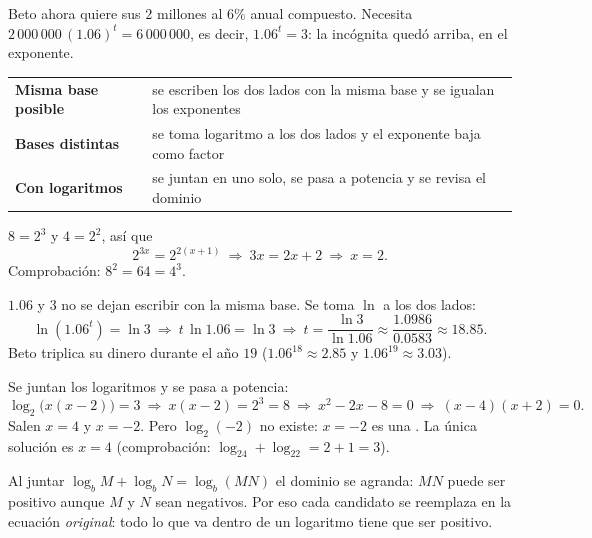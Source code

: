 \documentclass[11pt,a4paper]{article}
\begin{document}

Beto ahora quiere  sus $2$ millones al $6\%$ anual compuesto. Necesita
$2\,000\,000\,(1.06)^{t}=6\,000\,000$, es decir, $1.06^{t}=3$: la incógnita quedó arriba, en el exponente.

\begin{clavebox}[ESTRATEGIA]
\renewcommand{\arraystretch}{1.4}\begin{tabularx}{\linewidth}{@{}l L@{}}
\textbf{Misma base posible} & se escriben los dos lados con la misma base y se igualan los exponentes\\
\textbf{Bases distintas} & se toma logaritmo a los dos lados y el exponente baja como factor\\
\textbf{Con logaritmos} & se juntan en uno solo, se pasa a potencia y se revisa el dominio
\end{tabularx}
\end{clavebox}

\begin{ejemplo}[Misma base: $8^{x}=4^{x+1}$]
$8=2^{3}$ y $4=2^{2}$, así que
\[ 2^{3x}=2^{2(x+1)}\ \Longrightarrow\ 3x=2x+2\ \Longrightarrow\ x=2 . \]
Comprobación: $8^{2}=64=4^{3}$.
\end{ejemplo}

\begin{ejemplo}
$1.06$ y $3$ no se dejan escribir con la misma base. Se toma $\ln$ a los dos lados:
\[ \ln\left(1.06^{t}\right)=\ln 3\ \Longrightarrow\ t\,\ln1.06=\ln3\ \Longrightarrow\ t=\frac{\ln3}{\ln1.06}\approx\frac{1.0986}{0.0583}\approx18.85 . \]
Beto triplica su dinero durante el año $19$ ($1.06^{18}\approx2.85$ y $1.06^{19}\approx3.03$).
\end{ejemplo}

\begin{ejemplo}[Con logaritmos: $\log_2 x+\log_2(x-2)=3$]
Se juntan los logaritmos y se pasa a potencia:
\[ \log_2\big(x(x-2)\big)=3\ \Longrightarrow\ x(x-2)=2^{3}=8\ \Longrightarrow\ x^2-2x-8=0\ \Longrightarrow\ (x-4)(x+2)=0 . \]
Salen $x=4$ y $x=-2$. Pero $\log_2(-2)$ no existe: $x=-2$ es una . La única solución es $x=4$
(comprobación: $\log_24+\log_22=2+1=3$).
\end{ejemplo}

\begin{ojo}
Al juntar $\log_b M+\log_b N=\log_b(MN)$ el dominio se agranda: $MN$ puede ser positivo aunque $M$ y $N$ sean
negativos. Por eso cada candidato se reemplaza en la ecuación \emph{original}: todo lo que va dentro de un logaritmo
tiene que ser positivo.
\end{ojo}
\end{document}
